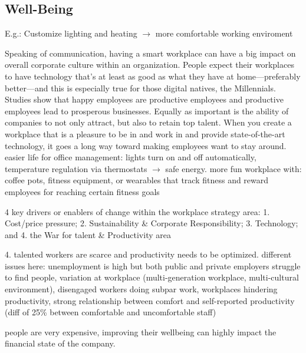 \subsection{Well-Being}

E.g.: Customize lighting and heating \(\rightarrow\) more comfortable working enviroment\cite{iotagenda}

Speaking of communication, having a smart workplace can have a big impact on overall corporate culture within an organization. People expect their workplaces to have technology that’s at least as good as what they have at home—preferably better—and this is especially true for those digital natives, the Millennials. Studies show that happy employees are productive employees and productive employees lead to prosperous businesses. Equally as important is the ability of companies to not only attract, but also to retain top talent. When you create a workplace that is a pleasure to be in and work in and provide state-of-the-art technology, it goes a long way toward making employees want to stay around. easier life for office management: lights turn on and off automatically, temperature regulation via thermostats \(\rightarrow\) safe energy. more fun workplace with: coffee pots, fitness equipment, or wearables that track fitness and reward employees for
reaching certain fitness goals\cite{hbcommunications}

4 key drivers or enablers of change within the workplace strategy area: 1. Cost/price pressure; 2. Sustainability \& Corporate Responsibility; 3. Technology; and 4. the War for talent \& Productivity area\cite{hub13}




4. talented workers are scarce and productivity needs to be optimized. different issues here: unemployment is high but both public and private employers struggle to find people, variation at workplace (multi-generation workplace, multi-cultural environment), disengaged workers doing subpar work, workplaces hindering productivity, strong relationship between comfort and self-reported productivity (diff of 25\% between comfortable and uncomfortable staff)\cite{hub13}

people are very expensive, improving their wellbeing can highly impact the financial state of the company. \cite{hub13}
